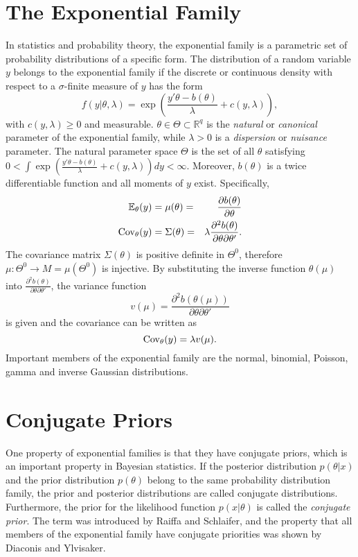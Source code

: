 \documentclass[12pt]{book}
\begin{document}
\section{The Exponential Family}
In statistics and probability theory, the exponential family is a parametric set of probability distributions of a specific form. The distribution of a random variable $y$ belongs to the exponential family if the discrete or continuous density with respect to a $\sigma$-finite measure of $y$ has the form
\begin{equation}
    f(y|\theta, \lambda)=\exp\left(\frac{y'\theta - b(\theta)}{\lambda}+c(y,\lambda) \right),
\end{equation}
with $c(y,\lambda)\geq 0$ and measurable. $\theta\in\Theta\subset\mathbb{R}^q$ is the \textit{natural} or \textit{canonical} parameter of the exponential family, while $\lambda > 0$ is a \textit{dispersion} or \textit{nuisance} parameter. The natural parameter space $\Theta$ is the set of all $\theta$ satisfying $0<\int\exp\left(\frac{y'\theta - b(\theta)}{\lambda}+c(y,\lambda) \right)dy< \infty$. Moreover, $b(\theta)$ is a twice differentiable  function and all moments of $y$ exist. Specifically, 
\begin{alignat}{3}
    \mathbb{E}_\theta(y) &= \mu(\theta) =& \frac{\partial b(\theta)}{\partial\theta} \\
    \hbox{Cov}_\theta(y) &= \Sigma(\theta) =& \lambda\frac{\partial^2b(\theta)}{\partial\theta\partial\theta'}.
\end{alignat}
The covariance matrix $\Sigma(\theta)$ is positive definite in $\Theta^0$, therefore $\mu:\Theta^0\rightarrow  M = \mu\left(\Theta^0\right)$ is injective. By substituting the inverse function $\theta(\mu)$ into $\frac{\partial^2b(\theta)}{\partial\theta\partial\theta'}$, the variance function 
\begin{equation}
    v(\mu)=\frac{\partial^2b(\theta(\mu))}{\partial\theta\partial\theta'}
\end{equation}
is given and the covariance can be written as
\begin{equation}
    \hbox{Cov}_\theta(y) = \lambda v(\mu).
\end{equation}
Important members of the exponential family are the normal, binomial, Poisson, gamma and inverse Gaussian distributions. \autocite[Cf.][]{fahrmeir2013multivariate} 
\section{Conjugate Priors}
One property of exponential families is that they have conjugate priors, which is an important property in Bayesian statistics. If the posterior distribution $p(\theta|x)$ and the prior distribution $p(\theta)$ belong to the same probability distribution family, the prior and posterior distributions are called conjugate distributions. Furthermore, the prior for the likelihood function $p(x|\theta)$ is called the \textit{conjugate prior}. The term was introduced by Raiffa and Schlaifer\autocite[Cf.][]{raiffaapplied}, and the property that all members of the exponential family have conjugate priorities was shown by Diaconis and Ylvisaker.\autocite[Cf.][]{diaconis1979conjugate}
\end{document}
